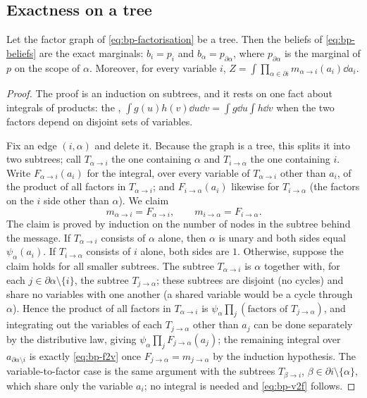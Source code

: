 \subsection{Exactness on a tree}

\begin{theorem}
\label{thm:bp-exact}
Let the factor graph of \cref{eq:bp-factorisation} be a tree. Then the beliefs of
\cref{eq:bp-beliefs} are the exact marginals: $b_i=p_i$ and $b_\alpha=p_{\partial\alpha}$,
where $p_{\partial\alpha}$ is the marginal of $p$ on the scope of $\alpha$. Moreover, for
every variable $i$, $Z=\int\prod_{\alpha\in\partial i} m_{\alpha\to i}(a_i)\dd a_i$.
\end{theorem}

\begin{proof}
The proof is an induction on subtrees, and it rests on one fact about integrals of
products: the , $\int g(u)h(v)\dd u\dd v=\int g\dd u\int h\dd v$
when the two factors depend on disjoint sets of variables.

Fix an edge $(i,\alpha)$ and delete it. Because the graph is a tree, this splits it into
two subtrees; call $T_{\alpha\to i}$ the one containing $\alpha$ and $T_{i\to\alpha}$ the one
containing $i$. Write $F_{\alpha\to i}(a_i)$ for the integral, over every variable of
$T_{\alpha\to i}$ other than $a_i$, of the product of all factors in $T_{\alpha\to i}$; and
$F_{i\to\alpha}(a_i)$ likewise for $T_{i\to\alpha}$ (the factors on the $i$ side other than
$\alpha$). We claim
\begin{equation}
  m_{\alpha\to i}=F_{\alpha\to i},\qquad m_{i\to\alpha}=F_{i\to\alpha}.
  \label{eq:bp-claim}
\end{equation}
The claim is proved by induction on the number of nodes in the subtree behind the
message. If $T_{\alpha\to i}$ consists of $\alpha$ alone, then $\alpha$ is unary and both
sides equal $\psi_\alpha(a_i)$. If $T_{i\to\alpha}$ consists of $i$ alone, both sides are
$1$. Otherwise, suppose the claim holds for all smaller subtrees. The subtree
$T_{\alpha\to i}$ is $\alpha$ together with, for each $j\in\partial\alpha\setminus\{i\}$, the
subtree $T_{j\to\alpha}$; these subtrees are disjoint (no cycles) and share no variables
with one another (a shared variable would be a cycle through $\alpha$). Hence the product
of all factors in $T_{\alpha\to i}$ is $\psi_\alpha\prod_j(\text{factors of }T_{j\to\alpha})$,
and integrating out the variables of each $T_{j\to\alpha}$ other than $a_j$ can be done
separately by the distributive law, giving $\psi_\alpha\prod_j F_{j\to\alpha}(a_j)$; the
remaining integral over $a_{\partial\alpha\setminus i}$ is exactly \cref{eq:bp-f2v} once
$F_{j\to\alpha}=m_{j\to\alpha}$ by the induction hypothesis. The variable-to-factor case
is the same argument with the subtrees $T_{\beta\to i}$, $\beta\in\partial i\setminus\{\alpha\}$,
which share only the variable $a_i$; no integral is needed and
\cref{eq:bp-v2f} follows.


\end{proof}
